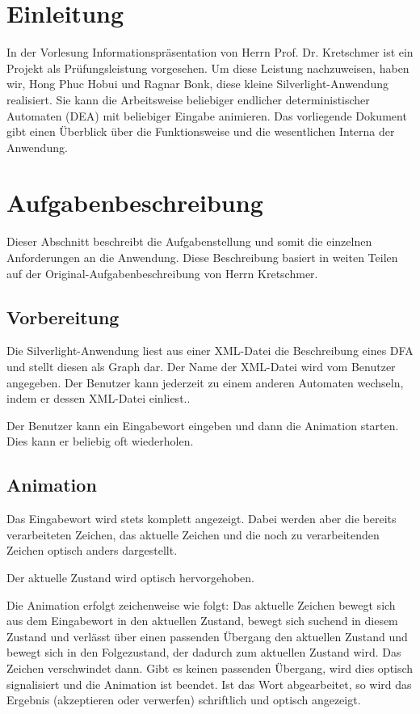 \section{Einleitung}

In der Vorlesung Informationspräsentation von Herrn Prof. Dr. Kretschmer ist
ein Projekt als Prüfungsleistung vorgesehen. Um diese Leistung nachzuweisen,
haben wir, Hong Phuc Hobui und Ragnar Bonk, diese kleine Silverlight-Anwendung
realisiert. Sie kann die Arbeitsweise beliebiger endlicher deterministischer
Automaten (DEA) mit beliebiger Eingabe animieren. Das vorliegende Dokument gibt
einen Überblick über die Funktionsweise und die wesentlichen Interna der
Anwendung.

\section{Aufgabenbeschreibung}
Dieser Abschnitt beschreibt die Aufgabenstellung und somit die einzelnen
Anforderungen an die Anwendung. Diese Beschreibung basiert in weiten Teilen auf
der Original-Aufgabenbeschreibung von Herrn Kretschmer.

\subsection{Vorbereitung}
Die Silverlight-Anwendung liest aus einer XML-Datei die Beschreibung eines DFA
und stellt diesen als Graph dar. Der Name der XML-Datei wird vom Benutzer
angegeben. Der Benutzer kann jederzeit zu einem anderen Automaten wechseln,
indem er dessen XML-Datei einliest.. 

Der Benutzer kann ein Eingabewort eingeben und dann die Animation starten. Dies
kann er beliebig oft wiederholen. 

\subsection{Animation}
Das Eingabewort wird stets komplett angezeigt. Dabei werden aber die bereits
verarbeiteten Zeichen, das aktuelle Zeichen und die noch zu verarbeitenden
Zeichen optisch anders dargestellt. 

Der aktuelle Zustand wird optisch hervorgehoben. 

Die Animation erfolgt zeichenweise wie folgt: Das aktuelle Zeichen bewegt sich
aus dem Eingabewort in den aktuellen Zustand, bewegt sich \glqq{}suchend\grqq{}
in diesem Zustand und verlässt über einen passenden Übergang den aktuellen
Zustand und bewegt sich in den Folgezustand, der dadurch zum aktuellen Zustand
wird. Das Zeichen verschwindet dann. Gibt es keinen passenden Übergang, wird
dies optisch signalisiert und die Animation ist beendet. Ist das Wort
abgearbeitet, so wird das Ergebnis (akzeptieren oder verwerfen) schriftlich und
optisch angezeigt. 

